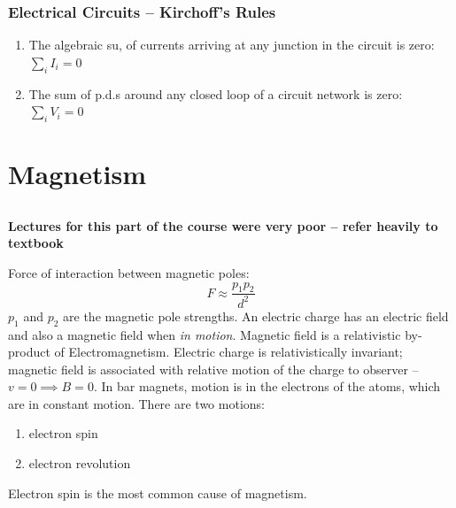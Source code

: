 \documentclass[a4paper, 11pt, normalem]{report}
\begin{document}
\section{Electrical Circuits -- Kirchoff's Rules}
\begin{enumerate}
    \item The algebraic su, of currents arriving at any junction in the circuit is zero: $\sum_{i} I_{i} = 0$
    \item The sum of p.d.s around any closed loop of a circuit network is zero: $\sum_{i} V_{i} = 0$
\end{enumerate}

\part{Magnetism}
\chapter{}
\textbf{Lectures for this part of the course were very poor -- refer heavily to textbook}

Force of interaction between magnetic poles:
\begin{equation}
    F \approx \frac{p_{1}p_{2}}{d^{2}}
\end{equation}
$p_{1}$ and $p_{2}$ are the magnetic pole strengths.
An electric charge has an electric field and also a magnetic field when \emph{in motion}.
Magnetic field is a relativistic by-product of Electromagnetism.
Electric charge is relativistically invariant; magnetic field is associated with relative motion of the charge to observer -- $v = 0 \implies B = 0$.
In bar magnets, motion is in the electrons of the atoms, which are in constant motion.
There are two motions:
\begin{enumerate}
    \item electron spin
    \item electron revolution
\end{enumerate}
Electron spin is the most common cause of magnetism.
\end{document}
